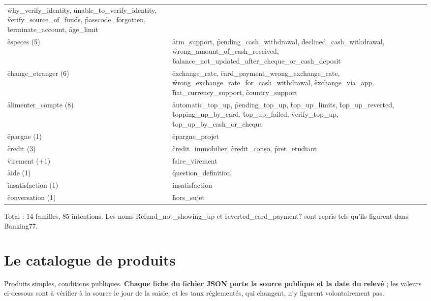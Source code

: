 \begin{center}
\begin{longtable}{@{}L{3.1cm} L{11.3cm}@{}}
  \f{why\_verify\_identity}, \f{unable\_to\_verify\_identity}, \f{verify\_source\_of\_funds},
  \f{passcode\_forgotten}, \f{terminate\_account}, \f{age\_limit} \\
\addlinespace
\f{especes} (5) & \f{atm\_support}, \f{pending\_cash\_withdrawal}, \f{declined\_cash\_withdrawal},
  \f{wrong\_amount\_of\_cash\_received}, \f{balance\_not\_updated\_after\_cheque\_or\_cash\_deposit} \\
\addlinespace
\f{change\_etranger} (6) & \f{exchange\_rate}, \f{card\_payment\_wrong\_exchange\_rate},
  \f{wrong\_exchange\_rate\_for\_cash\_withdrawal}, \f{exchange\_via\_app},
  \f{fiat\_currency\_support}, \f{country\_support} \\
\addlinespace
\f{alimenter\_compte} (8) & \f{automatic\_top\_up}, \f{pending\_top\_up}, \f{top\_up\_limits},
  \f{top\_up\_reverted}, \f{topping\_up\_by\_card}, \f{top\_up\_failed}, \f{verify\_top\_up},
  \f{top\_up\_by\_cash\_or\_cheque} \\
\midrule
\f{epargne} (1) & \f{epargne\_projet} \\
\f{credit} (3) & \f{credit\_immobilier}, \f{credit\_conso}, \f{pret\_etudiant} \\
\f{virement} (+1) & \f{faire\_virement} \\
\f{aide} (1) & \f{question\_definition} \\
\f{insatisfaction} (1) & \f{insatisfaction} \\
\f{conversation} (1) & \f{hors\_sujet} \\
\bottomrule
\end{longtable}
\end{center}

Total : 14 familles, 85 intentions. Les noms \f{Refund\_not\_showing\_up} et
\f{reverted\_card\_payment?} sont repris tels qu'ils figurent dans Banking77.

\chapter{Le catalogue de produits}
\label{an:catalogue}

Produits simples, conditions publiques. \textbf{Chaque fiche du fichier JSON porte la source
publique et la date du relevé} ; les valeurs ci-dessous sont à vérifier à la source le jour de la
saisie, et les taux réglementés, qui changent, n'y figurent volontairement pas.

